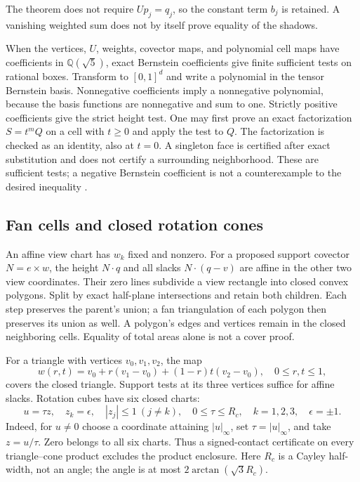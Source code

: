 \documentclass[11pt]{amsart}
\newcommand{\Q}{\mathbb Q}
\theoremstyle{definition}
\theoremstyle{remark}
\begin{document}
The theorem does not require $Up_j=q_j$, so the constant term $b_j$
is retained. A vanishing weighted sum does not by itself
prove equality of the shadows.

When the vertices, $U$, weights, covector maps, and polynomial cell maps have
coefficients in $\Q(\sqrt5)$, exact Bernstein coefficients give finite
sufficient tests on rational boxes. Transform to $[0,1]^d$ and write a polynomial in the tensor
Bernstein basis. Nonnegative coefficients imply a nonnegative polynomial,
because the basis functions are nonnegative and sum to one. Strictly
positive coefficients give the strict height test. One may first prove an
exact factorization $S=t^mQ$ on a cell with $t\ge0$ and apply the test to
$Q$. The factorization is checked as an identity, also at $t=0$. A
singleton face is certified after exact substitution and does not certify
a surrounding neighborhood. These are sufficient tests; a negative
Bernstein coefficient is not a counterexample to the desired inequality
\cite{signed}.

\subsection{Fan cells and closed rotation cones}\label{sec:fan}
An affine view chart has $w_k$ fixed and nonzero. For a proposed support
covector $N=e\times w$, the height $N\cdot q$ and all slacks
$N\cdot(q-v)$ are affine in the other two view coordinates. Their zero
lines subdivide a view rectangle into closed convex polygons. Split by
exact half-plane intersections and retain both children. Each step
preserves the parent's union; a fan triangulation of each polygon then
preserves its union as well. A polygon's edges and vertices remain in the
closed neighboring cells. Equality of total areas alone is not a cover
proof.

For a triangle with vertices $v_0,v_1,v_2$, the map
\[
 w(r,t)=v_0+r(v_1-v_0)+(1-r)t(v_2-v_0),\quad 0\le r,t\le1,
\]
covers the closed triangle. Support tests at its three vertices suffice
for affine slacks. Rotation cubes have six closed charts:
\begin{equation}\label{eq:sixcones}
 u=\tau z,\quad z_k=\epsilon,\quad |z_j|\le1\ (j\ne k),
 \quad 0\le\tau\le R_c,\quad k=1,2,3,\quad\epsilon=\pm1.
\end{equation}
Indeed, for $u\ne0$ choose a coordinate attaining $|u|_\infty$, set
$\tau=|u|_\infty$, and take $z=u/\tau$. Zero belongs to all six charts.
Thus a signed-contact certificate on every triangle--cone product excludes
the product enclosure. Here $R_c$ is a Cayley half-width, not an angle;
the angle is at most $2\arctan(\sqrt3R_c)$.
\end{document}
